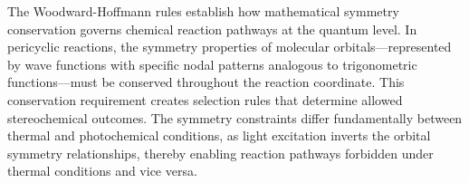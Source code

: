 The Woodward-Hoffmann rules establish how mathematical symmetry conservation governs chemical reaction pathways at the quantum level. In pericyclic reactions, the symmetry properties of molecular orbitals—represented by wave functions with specific nodal patterns analogous to trigonometric functions—must be conserved throughout the reaction coordinate. This conservation requirement creates selection rules that determine allowed stereochemical outcomes. The symmetry constraints differ fundamentally between thermal and photochemical conditions, as light excitation inverts the orbital symmetry relationships, thereby enabling reaction pathways forbidden under thermal conditions and vice versa.

